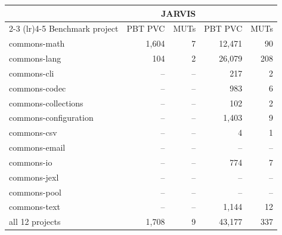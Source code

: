   \begin{tabular*}{\linewidth}{@{\hspace{\tabcolsep}\extracolsep{\fill}}lrrrr}
  \toprule
   & \multicolumn{2}{r}{JARVIS} & \multicolumn{2}{r}{\ToolTeralizer{}} \\
  \cmidrule(lr){2-3} \cmidrule(lr){4-5}
  Benchmark project & PBT PVC & MUTs & PBT PVC & MUTs \\
  \midrule
  commons-math & 1,604 & 7 & 12,471 & 90 \\
  commons-lang & 104 & 2 & 26,079 & 208 \\
  commons-cli & -- & -- & 217 & 2 \\
  commons-codec & -- & -- & 983 & 6 \\
  commons-collections & -- & -- & 102 & 2 \\
  commons-configuration & -- & -- & 1,403 & 9 \\
  commons-csv & -- & -- & 4 & 1 \\
  commons-email & -- & -- & -- & -- \\
  commons-io & -- & -- & 774 & 7 \\
  commons-jexl & -- & -- & -- & -- \\
  commons-pool & -- & -- & -- & -- \\
  commons-text & -- & -- & 1,144 & 12 \\
  \midrule
  all 12 projects & 1,708 & 9 & 43,177 & 337 \\
  \bottomrule
  \end{tabular*}
